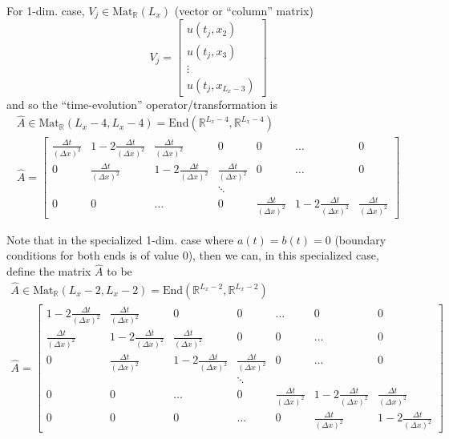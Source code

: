 \documentclass[10pt]{amsart}
\begin{document}
\begin{multicols*}{2}
  For 1-dim. case, $V_j \in \text{Mat}_{\mathbb{R}}(L_x)$ (vector or ``column'' matrix)
\[
  V_j = \left[ \begin{matrix} u(t_j,x_2) \\
      u(t_j,x_3) \\
      \vdots \\
      u(t_j,x_{L_x-3}) \end{matrix} \right]
\]
  and so the ``time-evolution'' operator/transformation is
\begin{equation}
  \begin{gathered}
    \widehat{A} \in \text{Mat}_{\mathbb{R}}(L_x-4,L_x-4) = \text{End}(\mathbb{R}^{L_x-4}, \mathbb{R}^{L_x-4}) \\
    \widehat{A} = \left[ \begin{matrix}
         \frac{ \Delta t}{ (\Delta x)^2 } & 1 -  2 \frac{ \Delta t}{ (\Delta x)^2 } &  \frac{ \Delta t}{ (\Delta x)^2 } & 0 & 0 & \dots & 0  \\ 
         0 &  \frac{ \Delta t}{ (\Delta x)^2 } & 1 - 2  \frac{ \Delta t}{ (\Delta x)^2 } &  \frac{ \Delta t}{ (\Delta x)^2 } & 0 & \dots & 0 \\
         &  &  & \ddots  &   &   & \\
      0   & 0  & \dots  & 0        &  \frac{ \Delta t}{ (\Delta x)^2 } & 1 - 2  \frac{ \Delta t}{ (\Delta x)^2 } &  \frac{ \Delta t}{ (\Delta x)^2 } 
        \end{matrix} \right]
  \end{gathered}
\end{equation}  

Note that in the specialized 1-dim. case where $a(t) = b(t)=0$ (boundary conditions for both ends is of value $0$), then we can, in this specialized case, define the matrix $\widehat{A}$ to be
\begin{equation}
  \begin{gathered}
    \widehat{A} \in \text{Mat}_{\mathbb{R}}(L_x-2,L_x-2) = \text{End}(\mathbb{R}^{L_x-2}, \mathbb{R}^{L_x-2}) \\
    \widehat{A} = \left[ \begin{matrix}
        1 - 2  \frac{ \Delta t}{ (\Delta x)^2 } &  \frac{ \Delta t}{ (\Delta x)^2 } & 0 & 0 & \dots  &  0 & 0 \\
         \frac{ \Delta t}{ (\Delta x)^2 } & 1 -  2 \frac{ \Delta t}{ (\Delta x)^2 } &  \frac{ \Delta t}{ (\Delta x)^2 } & 0 & 0 & \dots & 0  \\ 
         0 &  \frac{ \Delta t}{ (\Delta x)^2 } & 1 - 2  \frac{ \Delta t}{ (\Delta x)^2 } &  \frac{ \Delta t}{ (\Delta x)^2 } & 0 & \dots & 0 \\
         &  &  & \ddots  &   &   & \\
         0   & 0  & \dots  & 0        &  \frac{ \Delta t}{ (\Delta x)^2 } & 1 - 2  \frac{ \Delta t}{ (\Delta x)^2 } &  \frac{ \Delta t}{ (\Delta x)^2 }  \\
         0 & 0 & 0 & \dots & 0 &  \frac{ \Delta t}{ (\Delta x)^2 } & 1 - 2  \frac{ \Delta t}{ (\Delta x)^2 } 
        \end{matrix} \right]
  \end{gathered}
\end{equation}  


\end{multicols*}
\end{document}
